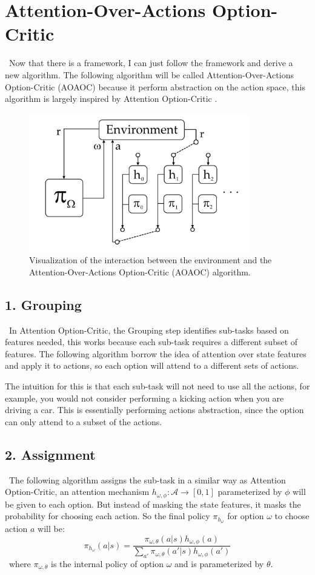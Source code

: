 \documentclass{article}
\begin{document}
	\section{Attention-Over-Actions Option-Critic}
	\qquad \ Now that there is a framework, I can just follow the framework and derive a new algorithm. The following algorithm will be called Attention-Over-Actions Option-Critic (AOAOC) because it perform abstraction on the action space, this algorithm is largely inspired by Attention Option-Critic \cite{attentionoptioncritic}.
	\begin{figure}[h]
		\centering
		\includegraphics[width=3.8in]{aoaoc.png}
		\caption{Visualization of the interaction between the environment and the Attention-Over-Actions Option-Critic (AOAOC) algorithm.}
	\end{figure}
	\subsection*{1. Grouping}
	\qquad \ In Attention Option-Critic, the Grouping step identifies sub-tasks based on features needed, this works because each sub-task requires a different subset of features. The following algorithm borrow the idea of attention over state features and apply it to actions, so each option will attend to a different sets of actions. 
	
	\quad The intuition for this is that each sub-task will not need to use all the actions, for example, you would not consider performing a kicking action when you are driving a car. This is essentially performing actions abstraction, since the option can only attend to a subset of the actions.
	\subsection*{2. Assignment}
	\qquad \ The following algorithm assigns the sub-task in a similar way as Attention Option-Critic, an attention mechanism $h_{\omega,\phi}:\mathcal{A} \rightarrow [0,1]$ parameterized by $\phi$ will be given to each option. But instead of masking the state features, it masks the probability for choosing each action. So the final policy $\pi_{h_\omega}$ for option $\omega$ to choose action $a$ will be: $$\pi_{h_\omega}(a|s) = \frac{\pi_{\omega,\theta}(a|s)h_{\omega, \phi}(a)}{\sum_{a'} \pi_{\omega,\theta}(a'|s)h_{\omega, \phi}(a')}$$ \qquad \ where $\pi_{\omega,\theta}$ is the internal policy of option $\omega$ and is parameterized by $\theta$.
	
\end{document}
